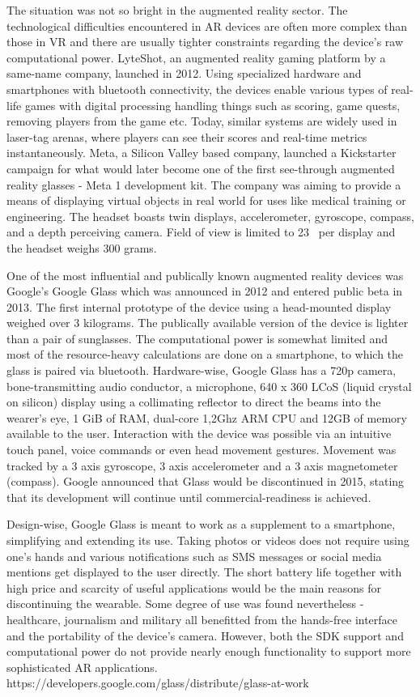 \documentclass[12pt, a4paper]{article}
\begin{document}
The situation was not so bright in the augmented reality sector. The technological difficulties encountered in AR devices are often more complex than those in VR and there are usually tighter constraints regarding the device’s raw computational power. LyteShot, an augmented reality gaming platform by a same-name company, launched in 2012. Using specialized hardware and smartphones with bluetooth connectivity, the devices enable various types of real-life games with digital processing handling things such as scoring, game quests, removing players from the game etc. Today, similar systems are widely used in laser-tag arenas, where players can see their scores and real-time metrics instantaneously. Meta, a Silicon Valley based company, launched a Kickstarter campaign for what would later become one of the first see-through augmented reality glasses - Meta 1 development kit. The company was aiming to provide a means of displaying virtual objects in real world for uses like medical training or engineering. The headset boasts twin displays, accelerometer, gyroscope, compass, and a depth perceiving camera. Field of view is limited to 23\degree~ per display and the headset weighs 300 grams.

One of the most influential and publically known augmented reality devices was Google’s Google Glass which was announced in 2012 and entered public beta in 2013. The first internal prototype of the device using a head-mounted display weighed over 3 kilograms. The publically available version of the device is lighter than a pair of sunglasses. The computational power is somewhat limited and most of the resource-heavy calculations are done on a smartphone, to which the glass is paired via bluetooth. Hardware-wise, Google Glass has a 720p camera, bone-transmitting audio conductor, a microphone, 640 x 360 LCoS (liquid crystal on silicon) display using a collimating reflector to direct the beams into the wearer’s eye, 1 GiB of RAM, dual-core 1,2Ghz ARM CPU and 12GB of memory available to the user. Interaction with the device was possible via an intuitive touch panel, voice commands or even head movement gestures. Movement was tracked by a 3 axis gyroscope, 3 axis accelerometer and a 3 axis magnetometer (compass). Google announced that Glass would be discontinued in 2015, stating that its development will continue until commercial-readiness is achieved.

Design-wise, Google Glass is meant to work as a supplement to a smartphone, simplifying and extending its use. Taking photos or videos does not require using one’s hands and various notifications such as SMS messages or social media mentions get displayed to the user directly. The short battery life together with high price and scarcity of useful applications would be the main reasons for discontinuing the wearable. Some degree of use was found nevertheless - healthcare, journalism and military all benefitted from the hands-free interface and the portability of the device’s camera. However, both the SDK support and computational power do not provide nearly enough functionality to support more sophisticated AR applications.
https://developers.google.com/glass/distribute/glass-at-work
\end{document}

